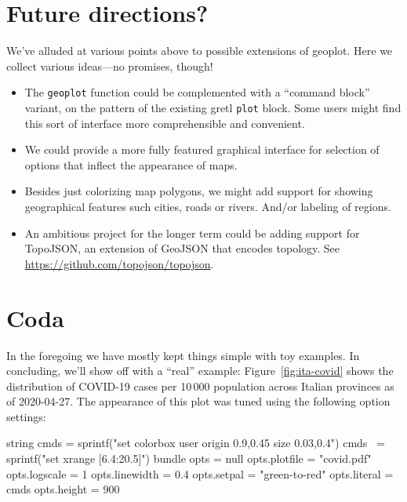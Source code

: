 \documentclass{article}
\begin{document}
\section{Future directions?}
\label{sec:future}

We've alluded at various points above to possible extensions of
\textsf{geoplot}. Here we collect various ideas---no promises, though!

\begin{itemize}
\item The \texttt{geoplot} function could be complemented with a
  ``command block'' variant, on the pattern of the existing gretl
  \texttt{plot} block. Some users might find this sort of interface
  more comprehensible and convenient.
\item We could provide a more fully featured graphical interface for
  selection of options that inflect the appearance of maps.
\item Besides just colorizing map polygons, we might add support
  for showing geographical features such cities, roads or rivers.
  And/or labeling of regions.
\item An ambitious project for the longer term could be adding support
  for TopoJSON, an extension of GeoJSON that encodes topology. See
  \url{https://github.com/topojson/topojson}.
\end{itemize}

\section*{Coda}

In the foregoing we have mostly kept things simple with toy
examples. In concluding, we'll show off with a ``real'' example:
Figure~\ref{fig:ita-covid} shows the distribution of COVID-19 cases
per 10\,000 population across Italian provinces as of 2020-04-27. The
appearance of this plot was tuned using the following option settings:
\begin{code}
string cmds = sprintf("set colorbox user origin 0.9,0.45 size 0.03,0.4\n")
cmds ~= sprintf("set xrange [6.4:20.5]")
bundle opts = null
opts.plotfile = "covid.pdf"
opts.logscale = 1
opts.linewidth = 0.4
opts.setpal = "green-to-red"
opts.literal = cmds
opts.height = 900
\end{code}
\end{document}
